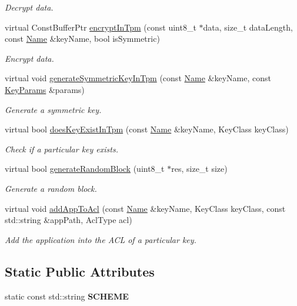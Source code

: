 \begin{DoxyCompactItemize}
\begin{DoxyCompactList}\small\item\em Decrypt data. \end{DoxyCompactList}\item 
virtual Const\+Buffer\+Ptr \hyperlink{classndn_1_1SecTpmOsx_a3766be9f3c87a671820764ab92a3b190}{encrypt\+In\+Tpm} (const uint8\+\_\+t $\ast$data, size\+\_\+t data\+Length, const \hyperlink{classndn_1_1Name}{Name} \&key\+Name, bool is\+Symmetric)
\begin{DoxyCompactList}\small\item\em Encrypt data. \end{DoxyCompactList}\item 
virtual void \hyperlink{classndn_1_1SecTpmOsx_a81e1830387e743fc2c60de8d452aa7b1}{generate\+Symmetric\+Key\+In\+Tpm} (const \hyperlink{classndn_1_1Name}{Name} \&key\+Name, const \hyperlink{classndn_1_1KeyParams}{Key\+Params} \&params)
\begin{DoxyCompactList}\small\item\em Generate a symmetric key. \end{DoxyCompactList}\item 
virtual bool \hyperlink{classndn_1_1SecTpmOsx_ac5230cef8c2ad13459943132808e0a30}{does\+Key\+Exist\+In\+Tpm} (const \hyperlink{classndn_1_1Name}{Name} \&key\+Name, Key\+Class key\+Class)
\begin{DoxyCompactList}\small\item\em Check if a particular key exists. \end{DoxyCompactList}\item 
virtual bool \hyperlink{classndn_1_1SecTpmOsx_a5ef985a74b3df2e0679da6b982c00615}{generate\+Random\+Block} (uint8\+\_\+t $\ast$res, size\+\_\+t size)
\begin{DoxyCompactList}\small\item\em Generate a random block. \end{DoxyCompactList}\item 
virtual void \hyperlink{classndn_1_1SecTpmOsx_a0f4c71ddd09037691ccf4e481b1664d7}{add\+App\+To\+Acl} (const \hyperlink{classndn_1_1Name}{Name} \&key\+Name, Key\+Class key\+Class, const std\+::string \&app\+Path, Acl\+Type acl)
\begin{DoxyCompactList}\small\item\em Add the application into the A\+CL of a particular key. \end{DoxyCompactList}\end{DoxyCompactItemize}
\subsection*{Static Public Attributes}
\begin{DoxyCompactItemize}
\item 
static const std\+::string {\bfseries S\+C\+H\+E\+ME}\hypertarget{classndn_1_1SecTpmOsx_aba87a5ca295bdd97553f090fe9f88a69}{}\label{classndn_1_1SecTpmOsx_aba87a5ca295bdd97553f090fe9f88a69}

\end{DoxyCompactItemize}
